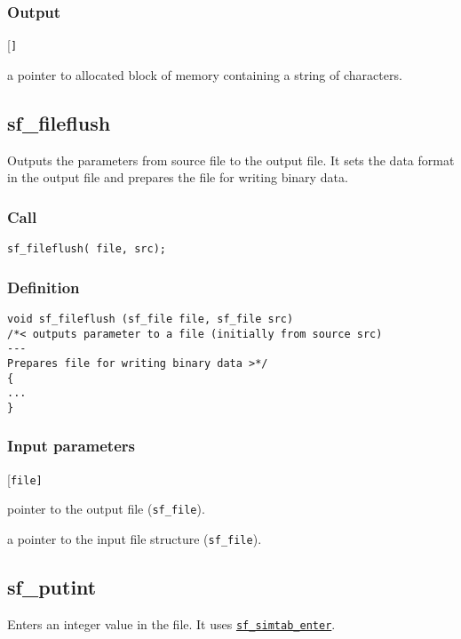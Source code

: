\subsubsection*{Output}
\begin{desclist}{\tt }{\quad}[\tt ]
   \setlength\itemsep{0pt}
   \item[string] a pointer to allocated block of memory containing a string of characters. 
\end{desclist}




\subsection{{sf\_fileflush}}
Outputs the parameters from source file to the output file. It sets the data format in the output file and prepares the file for writing binary data.

\subsubsection*{Call}
\begin{verbatim}sf_fileflush( file, src);\end{verbatim}

\subsubsection*{Definition}
\begin{verbatim}
void sf_fileflush (sf_file file, sf_file src)
/*< outputs parameter to a file (initially from source src)
---
Prepares file for writing binary data >*/ 
{
...
}
\end{verbatim}

\subsubsection*{Input parameters}
\begin{desclist}{\tt }{\quad}[\tt file]
   \setlength\itemsep{0pt}
   \item[file] pointer to the output file (\texttt{sf\_file}). 
   \item[src]  a pointer to the input file structure (\texttt{sf\_file}).
\end{desclist}




\subsection{{sf\_putint}}
Enters an integer value in the file. It uses \hyperref[sec:sf_simtab_enter]{\texttt{sf\_simtab\_enter}}.  

